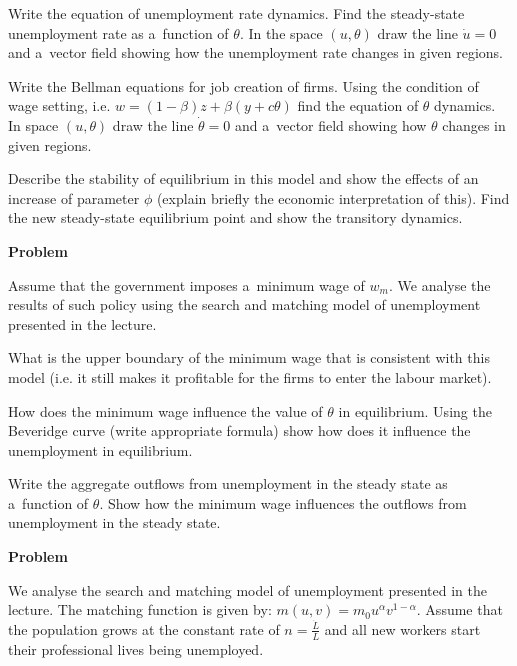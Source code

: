 \documentclass[a4paper, notitlepage, 11pt]{article}
\newcounter{zadlicz}[section]%
\newcommand{\tytul}[2]{\setcounter{equation}{0}\addtocounter{zadlicz}{1}\vspace{\abovedisplayskip}\noindent\textbf{#1\ \thezadlicz #2}}%
\begin{document}
\begin{wylicz}
\item Write the equation of unemployment rate dynamics. Find the steady-state unemployment rate as a~function of $\theta$. In the space $(u,\theta)$ draw the line $\dot u=0$ and a~vector field showing how the unemployment rate changes in given regions.
\item Write the Bellman equations for job creation of firms. Using the condition of wage setting, i.e. $w=(1-\beta)z+\beta(y+c\theta)$ find the equation of $\theta$ dynamics. In space $(u,\theta)$ draw the line $\dot \theta=0$ and a~vector field showing how $\theta$ changes in given regions.
\item Describe the stability of equilibrium in this model and show the effects of an increase of parameter $\phi$ (explain briefly the economic interpretation of this). Find the new steady-state equilibrium point and show the transitory dynamics.
\end{wylicz}


\tytul{Problem}{}

\noindent%
Assume that the government imposes a~minimum wage of $w_m$. We analyse the results of such policy using the search and matching model of unemployment presented in the lecture.

\begin{wylicz}
\item What is the upper boundary of the minimum wage that is consistent with this model (i.e. it still makes it profitable for the firms to enter the labour market).
\item How does the minimum wage influence the value of $\theta$ in equilibrium. Using the Beveridge curve (write appropriate formula) show how does it influence the unemployment in equilibrium.
\item Write the aggregate outflows from unemployment in the steady state as a~function of $\theta$. Show how the minimum wage influences the outflows from unemployment in the steady state.
\end{wylicz}


\tytul{Problem}{}

\noindent%
We analyse the search and matching model of unemployment presented in the lecture. The matching function is given by: $m(u,v)= m_0 u^\alpha v^{1-\alpha}$. Assume that the population grows at the constant rate of $n=\frac{\dot L}{L}$ and all new workers start their professional lives being unemployed.
\end{document}
